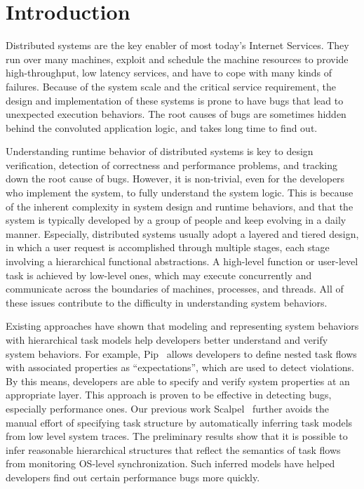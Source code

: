 
\section{Introduction}
\label{sec:intro}



Distributed systems are the key enabler of most
today's Internet Services. They run over many machines,
exploit and schedule the machine resources to provide
high-throughput, low latency services, and have to cope
with many kinds of failures. Because of the system scale
and the critical service requirement, the design and
implementation of these systems is prone to have bugs
that lead to unexpected execution behaviors.
The root causes of bugs are sometimes hidden behind
the convoluted application logic, and takes long time
to find out.

Understanding runtime behavior of distributed systems
is key to design verification, detection of correctness
and performance problems, and tracking down the root cause
of bugs. However, it is non-trivial, even for the developers
who implement the system, to fully understand the system
logic. This is because of the inherent complexity
in system design and runtime behaviors, and that
the system is typically developed by a group of people
and keep evolving in a daily manner.
Especially, distributed systems usually adopt a layered
and tiered design, in which a user request is accomplished
through multiple stages, each stage involving a hierarchical
functional abstractions. A high-level function or user-level
task is achieved by low-level ones, which may execute
concurrently and communicate across the boundaries of machines,
processes, and threads. All of these issues contribute to the
difficulty in understanding system behaviors.

Existing approaches have shown that modeling and representing
system behaviors with hierarchical task models help developers
better understand and verify system behaviors. For example,
Pip~\cite{Reynolds2006} allows developers to define nested task flows
with associated properties as ``expectations'', which are used
to detect violations.
By this means, developers are able to specify and verify
system properties at an appropriate layer. This approach is
proven to be effective in detecting bugs, especially
performance ones. Our previous work Scalpel~\cite{Haohui2008}
further avoids the manual effort of specifying task structure
by automatically inferring task models from low level
system traces. The preliminary results show that it is
possible to infer reasonable hierarchical structures that reflect
the semantics of task flows from monitoring OS-level synchronization.
Such inferred models have helped developers find out
certain performance bugs more quickly.

